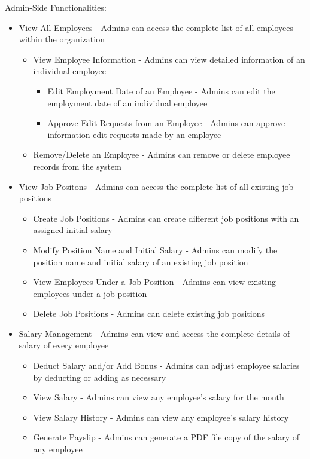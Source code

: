 \documentclass{icsthesis}
\begin{document}
\begin{mainmatter}
	Admin-Side Functionalities:
    \begin{itemize}
        \item View All Employees - Admins can access the complete list of all employees within the organization
    \begin{itemize}
        \item View Employee Information - Admins can view detailed information of an individual employee
    \begin{itemize}
        \item Edit Employment Date of an Employee - Admins can edit the employment date of an individual employee
        \item Approve Edit Requests from an Employee - Admins can approve information edit requests made by an employee
    \end{itemize}
    \item Remove/Delete an Employee - Admins can remove or delete employee records from the system
    \end{itemize}
    \item View Job Positons - Admins can access the complete list of all existing job positions
    \begin{itemize}
        \item Create Job Positions - Admins can create different job positions with an assigned initial salary
        \item Modify Position Name and Initial Salary - Admins can modify the position name and initial salary of an existing job position    
        \item View Employees Under a Job Position - Admins can view existing employees under a job position
        \item Delete Job Positions - Admins can delete existing job positions 
    \end{itemize}
    \item Salary Management - Admins can view and access the complete details of salary of every employee
    \begin{itemize}
        \item Deduct Salary and/or Add Bonus - Admins can adjust employee salaries by deducting or adding as necessary
        \item View Salary - Admins can view any employee's salary for the month
        \item View Salary History - Admins can view any employee's salary history
        \item Generate Payslip - Admins can generate a PDF file copy of the salary of any employee

\end{itemize}
\end{itemize}
\end{mainmatter}
\end{document}
